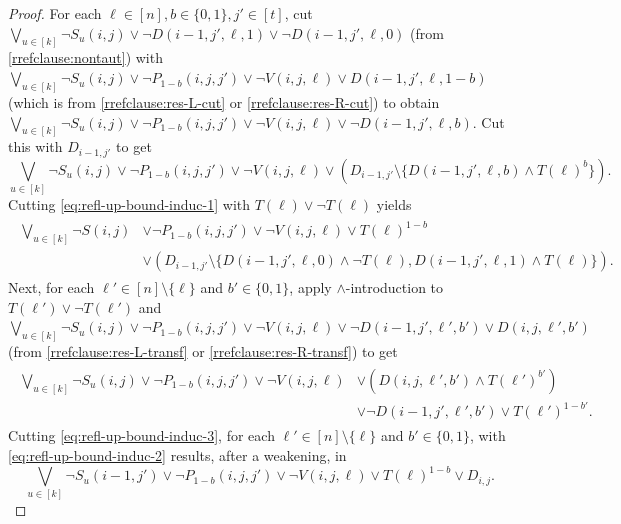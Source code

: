 \begin{proof}
For each $\ell \in [n], b \in \{0,1\}, j' \in [t]$, cut $\bigvee_{u \in [k]} \neg S_u(i,j) \lor \neg D(i-1,j',\ell,1) \lor \neg D(i-1,j',\ell,0)$ (from \eqref{rrefclause:nontaut}) with $\bigvee_{u \in [k]} \neg S_u(i,j) \lor \neg P_{1-b}(i,j,j') \lor \neg V(i,j,\ell) \lor D(i-1,j',\ell,1-b)$ (which is from \eqref{rrefclause:res-L-cut} or \eqref{rrefclause:res-R-cut}) to obtain $\bigvee_{u \in [k]} \neg S_u(i,j) \lor \neg P_{1-b}(i,j,j') \lor \neg V(i,j,\ell) \lor \neg D(i-1,j',\ell,b)$. Cut this with $D_{i-1,j'}$ to get
\begin{equation}
\label{eq:refl-up-bound-induc-1}
\bigvee_{u \in [k]} \neg S_u(i,j) \lor \neg P_{1-b}(i,j,j') \lor \neg V(i,j,\ell) \lor \left(D_{i-1,j'} \setminus \{ D(i-1,j',\ell,b) \land T(\ell)^b \}\right).
\end{equation}
Cutting \eqref{eq:refl-up-bound-induc-1} with $T(\ell) \lor \neg T(\ell)$ yields
\begin{align}
 \begin{split}
\label{eq:refl-up-bound-induc-2}
\bigvee_{u \in [k]} \neg S(i,j) & \lor \neg P_{1-b}(i,j,j') \lor \neg V(i,j,\ell) \lor T(\ell)^{1-b} \\
& \lor \left( D_{i-1,j'} \setminus \{ D(i-1,j',\ell,0) \land \neg T(\ell), D(i-1,j',\ell,1) \land T(\ell) \} \right).
 \end{split}
\end{align}
Next, for each $\ell' \in [n] \setminus \{\ell\}$ and $b' \in \{0,1\}$, apply $\land$-introduction to  $T(\ell') \lor \neg T(\ell')$ and $\bigvee_{u \in [k]} \neg S_u(i,j) \lor \neg P_{1-b}(i,j,j') \lor \neg V(i,j,\ell) \lor \neg D(i-1,j',\ell',b') \lor D(i,j,\ell',b')$ (from \eqref{rrefclause:res-L-transf} or \eqref{rrefclause:res-R-transf}) to get
\begin{align}
 \begin{split}
\label{eq:refl-up-bound-induc-3}
 \bigvee_{u \in [k]} \neg S_u(i,j) \lor \neg P_{1-b}(i,j,j') \lor \neg V(i,j,\ell) & \lor \left( D(i,j,\ell',b') \land T(\ell')^{b'} \right) \\
 & \lor \neg D(i-1,j',\ell',b') \lor T(\ell')^{1-b'}.
 \end{split}
\end{align}
Cutting \eqref{eq:refl-up-bound-induc-3}, for each $\ell'\in [n] \setminus \{\ell\}$ and $b' \in \{0,1\}$, with \eqref{eq:refl-up-bound-induc-2} results, after a weakening, in
\begin{equation}
\label{eq:refl-up-bound-induc-4}
\bigvee_{u \in [k]} \neg S_u(i-1,j') \lor \neg P_{1-b}(i,j,j') \lor \neg V(i,j,\ell) \lor T(\ell)^{1-b} \lor D_{i,j}.

\end{equation}
\end{proof}
